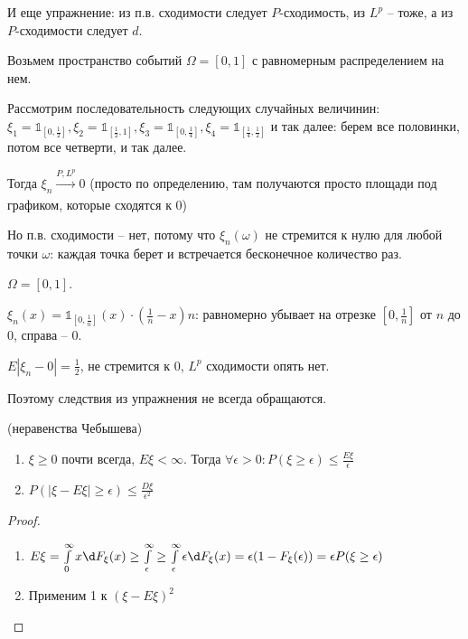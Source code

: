 И еще упражнение: из п.в. сходимости следует $P$-сходимость, из $L^p$ -- тоже, а из $P$-сходимости следует $d$.

\begin{exmp}
Возьмем пространство событий $\Omega = [0, 1]$ с равномерным распределением на нем.

Рассмотрим последовательность следующих случайных величинин: $\xi_1 = \mathbb{1}_{[0, \frac12]}, \xi_2 = \mathbb{1}_{[\frac12, 1]}, \xi_3 = \mathbb{1}_{[0, \frac14]}, \xi_4 = \mathbb{1}_{[\frac14, \frac12]}$ и так далее: 
берем все половинки, потом все четверти, и так далее.

Тогда $\xi_n \xrightarrow[]{P, L^p} 0$ (просто по определению, там получаются просто площади под графиком, которые сходятся к 0)

Но п.в. сходимости -- нет, потому что $\xi_n(\omega)$ не стремится к нулю для любой точки $\omega$: каждая точка берет и встречается бесконечное количество раз. 
\end{exmp}
\begin{exmp}
$\Omega = [0, 1]$.

$\xi_n(x) = \mathbb{1}_{[0, \frac1n]}(x) \cdot (\frac1n - x)n$: равномерно убывает на отрезке $[0, \frac1n]$ от $n$ до $0$, справа -- 0.

$E|\xi_n - 0| = \frac12$, не стремится к 0, $L^p$ сходимости опять нет.

Поэтому следствия из упражнения не всегда обращаются.
\end{exmp}

\begin{theorem} (неравенства Чебышева)

\begin{enumerate}

\item $\xi \geq 0$ почти всегда, $E\xi < \infty$. Тогда $\forall \epsilon > 0\colon P(\xi \geq \epsilon) \leq \frac{E\xi}{\epsilon}$

\item $P(|\xi - E\xi| \geq \epsilon) \leq \frac{D\xi}{\epsilon^2}$
\end{enumerate}
\begin{proof}
\begin{enumerate}                      
\item $E\xi = \int\limits_0^\infty x\d F_\xi(x) \geq \int\limits_\epsilon^\infty \geq \int\limits_\epsilon^\infty \epsilon \d F_\xi(x) = \epsilon (1 - F_\xi(\epsilon)) = \epsilon P(\xi \geq \epsilon)$

\item Применим 1 к $(\xi - E\xi)^2$ 
\end{enumerate}
\end{proof}
\end{theorem}


